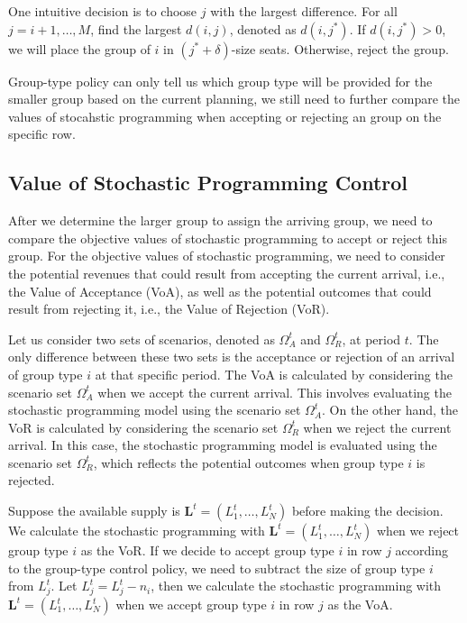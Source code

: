 
One intuitive decision is to choose $j$ with the largest difference. For all $j = i+1, \ldots, M$, find the largest $d(i,j)$, denoted as $d(i,j^{*})$. If $d(i,j^{*}) >0$, we will place the group of $i$ in $(j^{*}+\delta)$-size seats. Otherwise, reject the group.

Group-type policy can only tell us which group type will be provided for the smaller group based on the current planning, we still need to further compare the values of stocahstic programming when accepting or rejecting an group on the specific row. 




\subsection{Value of Stochastic Programming Control}
After we determine the larger group to assign the arriving group, we need to compare the objective values of stochastic programming to accept or reject this group. For the objective values of stochastic programming, we need to consider the potential revenues that could result from accepting the current arrival, i.e., the Value of Acceptance (VoA), as well as the potential outcomes that could result from rejecting it, i.e., the Value of Rejection (VoR).

Let us consider two sets of scenarios, denoted as $\Omega^{t}_{A}$ and $\Omega^{t}_{R}$, at period $t$. The only difference between these two sets is the acceptance or rejection of an arrival of group type $i$ at that specific period. The VoA is calculated by considering the scenario set $\Omega^{t}_{A}$ when we accept the current arrival. This involves evaluating the stochastic programming model using the scenario set $\Omega^{t}_{A}$. On the other hand, the VoR is calculated by considering the scenario set $\Omega^{t}_{R}$ when we reject the current arrival. In this case, the stochastic programming model is evaluated using the scenario set $\Omega^{t}_{R}$, which reflects the potential outcomes when group type $i$ is rejected.

Suppose the available supply is $\mathbf{L}^{t} = (L_1^{t}, \ldots, L_N^{t})$ before making the decision. We calculate the stochastic programming with $\mathbf{L}^{t}= (L_1^{t}, \ldots, L_N^{t})$ when we reject group type $i$ as the VoR. If we decide to accept group type $i$ in row $j$ according to the group-type control policy, we need to subtract the size of group type $i$ from $L_j^{t}$. Let $L_j^{t} = L_j^{t} - n_{i}$, then we calculate the stochastic programming with $\mathbf{L}^{t}= (L_1^{t}, \ldots, L_N^{t})$ when we accept group type $i$ in row $j$ as the VoA.

